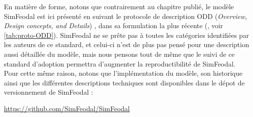 \begin{mdframed}[backgroundcolor=gray!10,footnoteinside=false]
En matière de forme, notons que contrairement au chapitre publié, le modèle SimFeodal est ici présenté en suivant le protocole de description \og ODD\fg{} (\textit{Overview, Design concepts, and Details}) \autocite{grimm_odd_2010}, dans sa formulation la plus récente (\cite{grimm_documenting_2017}, voir \cref{tab:proto-ODD}).
SimFeodal ne se prête pas à toutes les catégories identifiées par les auteurs de ce standard, et celui-ci n'est de plus pas pensé pour une description aussi détaillée du modèle\footnotemark, mais nous pensons tout de même que le suivi de ce standard d'adoption permettra d'augmenter la reproductibilité de SimFeodal.
Pour cette même raison, notons que l'implémentation du modèle, son historique ainsi que les différentes descriptions techniques sont disponibles dans le dépot de versionnement de SimFeodal :
\begin{center}
	\href{https://github.com/SimFeodal/SimFeodal}{https://github.com/SimFeodal/SimFeodal}
\end{center} 
\end{mdframed}

\clearpage

